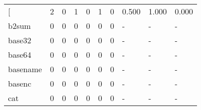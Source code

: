 \begin{longtable}{lp{1.3cm}p{1.3cm}p{1.3cm}p{1.3cm}p{1.3cm}p{1.3cm}p{1.3cm}p{1.3cm}p{1.3cm}}
\bottomrule
\endlastfoot
{[}         &                      2 &                                  0 &                                 1 &                                0 &                                 1 &                               0 &                                0.500 &                                  1.000 &                                0.000 \\
b2sum     &                      0 &                                  0 &                                 0 &                                0 &                                 0 &                               0 &                                    - &                                      - &                                    - \\
base32    &                      0 &                                  0 &                                 0 &                                0 &                                 0 &                               0 &                                    - &                                      - &                                    - \\
base64    &                      0 &                                  0 &                                 0 &                                0 &                                 0 &                               0 &                                    - &                                      - &                                    - \\
basename  &                      0 &                                  0 &                                 0 &                                0 &                                 0 &                               0 &                                    - &                                      - &                                    - \\
basenc    &                      0 &                                  0 &                                 0 &                                0 &                                 0 &                               0 &                                    - &                                      - &                                    - \\
cat       &                      0 &                                  0 &                                 0 &                                0 &                                 0 &                               0 &                                    - &                                      - &                                    - \\

\end{longtable}
